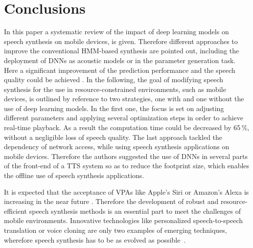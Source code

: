 

\section{Conclusions}
\label{sec:conclusion}

In this paper a systematic review of the impact of deep learning models on speech synthesis on mobile devices, is given. Therefore different approaches to improve the conventional \ac{HMM}-based synthesis are pointed out, including the deployment of \acp{DNN} as acoustic models or in the parameter generation task. Here a significant improvement of the prediction performance and the speech quality could be achieved \cite{zen:deepstatistical, hashimoto:effect}. In the following, the goal of modifying speech synthesis for the use in resource-constrained environments, such as mobile devices, is outlined by reference to two strategies, one with and one without the use of deep learning models. In the first one, the focus is set on adjusting different parameters and applying several optimization steps \cite{toth:optimizing} in order to achieve real-time playback. As a result the computation time could be decreased by 65\,\%, without a negligible loss of speech quality. The last approach \cite{boros:robust} tackled the dependency of network access, while using speech synthesis applications on mobile devices. Therefore the authors suggested the use of \acp{DNN} in several parts of the front-end of a \ac{TTS} system so as to reduce the footprint size, which enables the offline use of speech synthesis applications.

It is expected that the acceptance of \acp{VPA} like Apple's Siri or Amazon's Alexa is increasing in the near future \cite{gartner:assistants}. Therefore the development of robust and resource-efficient speech synthesis methods is an essential part to meet the challenges of mobile environments. Innovative technologies like personalized speech-to-speech translation or voice cloning are only two examples of emerging techniques, wherefore speech synthesis has to be as evolved as possible~\cite{edinburgh:speech}.

\iffalse
\vspace{2em}
See \cite{edinburgh:speech}
\begin{itemize}[leftmargin=10pt]
	\item Voice cloning
	\item Voice reconstruction
	\item Personalised speech-to-speech translation
	\item Articulatory-controllable speech synthesis
\end{itemize}
\fi